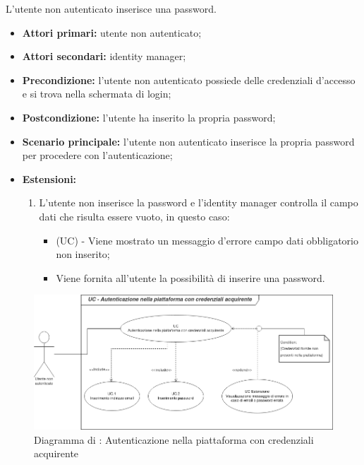 L'utente non autenticato inserisce una password.
\begin{itemize}
	\item \textbf{Attori primari:} utente non autenticato;
	\item \textbf{Attori secondari:} identity manager;
	\item \textbf{Precondizione:} l'utente non autenticato possiede delle credenziali d'accesso e si trova nella schermata di login;
	\item \textbf{Postcondizione:} l'utente ha inserito la propria password;
	\item \textbf{Scenario principale:} l'utente non autenticato inserisce la propria password per procedere con l'autenticazione;
	\item \textbf{Estensioni:} 
	\begin{enumerate}
		\item L'utente non inserisce la password e l'identity manager controlla il campo dati che risulta essere vuoto, in questo caso:
		\begin{itemize}
			\item (UC) - Viene mostrato un messaggio d'errore campo dati obbligatorio non inserito;
			\item Viene fornita all'utente la possibilità di inserire una password.
		\end{itemize}
	\end{enumerate} 
\end{itemize}

\begin{figure}[H]
	\centering
	\includegraphics[scale=0.6]{Immagini/DiagrammiUC/AccessoAcquirente.png}
	\caption{Diagramma di \actualUC: Autenticazione nella piattaforma con credenziali acquirente} 
	\label{fig:LoginAcquirente}
\end{figure}

